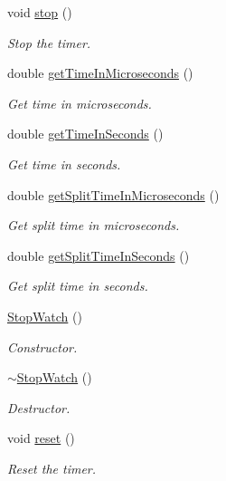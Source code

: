 \begin{DoxyCompactItemize}
void \mbox{\hyperlink{classUtil_1_1StopWatch_a8a89a1d02ece7c671ee1d9e9f42c88b2}{stop}} ()
\begin{DoxyCompactList}\small\item\em Stop the timer. \end{DoxyCompactList}\item 
double \mbox{\hyperlink{classUtil_1_1StopWatch_ab4de18812edf2336f96c52afcb0386b6}{get\+Time\+In\+Microseconds}} ()
\begin{DoxyCompactList}\small\item\em Get time in microseconds. \end{DoxyCompactList}\item 
double \mbox{\hyperlink{classUtil_1_1StopWatch_ab0bc68fe69855bd73f27cd8f4fa0a8c4}{get\+Time\+In\+Seconds}} ()
\begin{DoxyCompactList}\small\item\em Get time in seconds. \end{DoxyCompactList}\item 
double \mbox{\hyperlink{classUtil_1_1StopWatch_a5901023b831c6670d4184a9c6e85ff75}{get\+Split\+Time\+In\+Microseconds}} ()
\begin{DoxyCompactList}\small\item\em Get split time in microseconds. \end{DoxyCompactList}\item 
double \mbox{\hyperlink{classUtil_1_1StopWatch_aa0934b52920e4075317c6176675efb95}{get\+Split\+Time\+In\+Seconds}} ()
\begin{DoxyCompactList}\small\item\em Get split time in seconds. \end{DoxyCompactList}\item 
\mbox{\hyperlink{classUtil_1_1StopWatch_a7eeb59348e5efff8490d2e8e95b0f126}{Stop\+Watch}} ()
\begin{DoxyCompactList}\small\item\em Constructor. \end{DoxyCompactList}\item 
\mbox{\hyperlink{classUtil_1_1StopWatch_a149387c10f6c5da60cfde6de5173278b}{$\sim$\+Stop\+Watch}} ()
\begin{DoxyCompactList}\small\item\em Destructor. \end{DoxyCompactList}\item 
void \mbox{\hyperlink{classUtil_1_1StopWatch_a59e537525567ed9e0701635fb60148b7}{reset}} ()
\begin{DoxyCompactList}\small\item\em Reset the timer. \end{DoxyCompactList}\item 

\end{DoxyCompactItemize}
